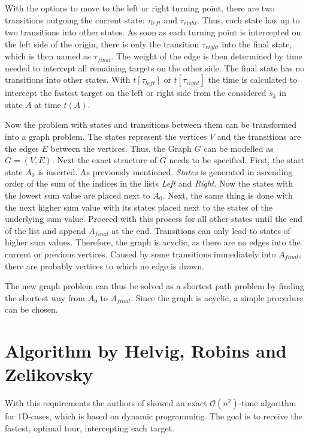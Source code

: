 \documentclass[english,version-2019-07]{uzl-thesis}
\begin{document}
With the options to move to the left or right turning point, there are two transitions outgoing the current state: $\tau_{left}$ and $\tau_{right}$. Thus, each state has up to two transitions into other states. As soon as each turning point is intercepted on the left side of the origin, there is only the transition $\tau_{right}$ into the final state, which is then named as $\tau_{final}$. The weight of the edge is then determined by time needed to intercept all remaining targets on the other side. The final state has no transitions into other states. With $t[\tau_{left}]$ or $t[\tau_{right}]$ the time is calculated to intercept the fastest target on the left or right side from the considered $s_k$ in state $A$ at time $t(A)$.

Now the problem with states and transitions between them can be transformed into a graph problem. The states represent the vertices $V$ and the transitions are the edges $E$ between the vertices. Thus, the Graph $G$ can be modelled as $G=(V,E)$. Next the exact structure of $G$ needs to be specified. First, the start state $A_0$ is inserted. As previously mentioned, \emph{States} is generated in ascending order of the sum of the indices in the lists \emph{Left} and \emph{Right}. Now the states with the lowest sum value are placed next to $A_0$. Next, the same thing is done with the next higher sum value with its states placed next to the states of the underlying sum value. Proceed with this process for all other states until the end of the list and append $A_{final}$ at the end. Transitions can only lead to states of higher sum values. Therefore, the graph is acyclic, as there are no edges into the current or previous vertices. Caused by some transitions immediately into $A_{final}$, there are probably vertices to which no edge is drawn.

The new graph problem can thus be solved as a shortest path problem by finding the shortest way from $A_0$ to $A_{final}$. Since the graph is acyclic, a simple procedure can be chosen. 

\section{Algorithm by Helvig, Robins and Zelikovsky}

With this requirements the authors of \cite{helvig} showed an exact $\mathcal{O}(n^2)$-time algorithm for 1D-cases, which is based on dynamic programming. The goal is to receive the fastest, optimal tour, intercepting each target. 
\end{document}
